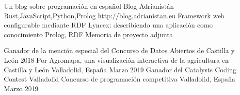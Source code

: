 \documentclass[]{awesome-cv}
\begin{document}
\vspace{-7mm}
\begin{cventries}
	\cventry
	{Un blog sobre programación en español}
	{Blog Adrianistán}
	{Rust,JavaScript,Python,Prolog}
	{http://blog.adrianistan.eu}
    {}
    \cventry
    {Framework web configurable mediante RDF}
    {Lyncex: describiendo una aplicación como conocimiento}
    {Prolog, RDF}
    {}
    {Memoria de proyecto adjunta}

	\vspace{-5mm}
\end{cventries}
\begin{cvhonors}
	\cvhonor
	{Ganador de la mención especial del Concurso de Datos Abiertos de Castilla y León 2018}
	{Por Agromapa, una visualización interactiva de la agricultura en Castilla y León}
	{Valladolid, España}
	{Marzo 2019}
	\cvhonor
	{Ganador del Catalysts Coding Contest Valladolid}
	{Concurso de programación competitiva}
	{Valladolid, España}
	{Marzo 2019}
\end{cvhonors}
\ 
\end{document}
